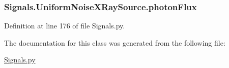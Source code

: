 \subsubsection[{\texorpdfstring{photon\+Flux}{photonFlux}}]{\setlength{\rightskip}{0pt plus 5cm}Signals.\+Uniform\+Noise\+X\+Ray\+Source.\+photon\+Flux}\hypertarget{classSignals_1_1UniformNoiseXRaySource_af240be1882d819db77da73100c4c95c5}{}\label{classSignals_1_1UniformNoiseXRaySource_af240be1882d819db77da73100c4c95c5}


Definition at line 176 of file Signals.\+py.



The documentation for this class was generated from the following file\+:\begin{DoxyCompactItemize}
\item 
\hyperlink{Signals_8py}{Signals.\+py}\end{DoxyCompactItemize}
